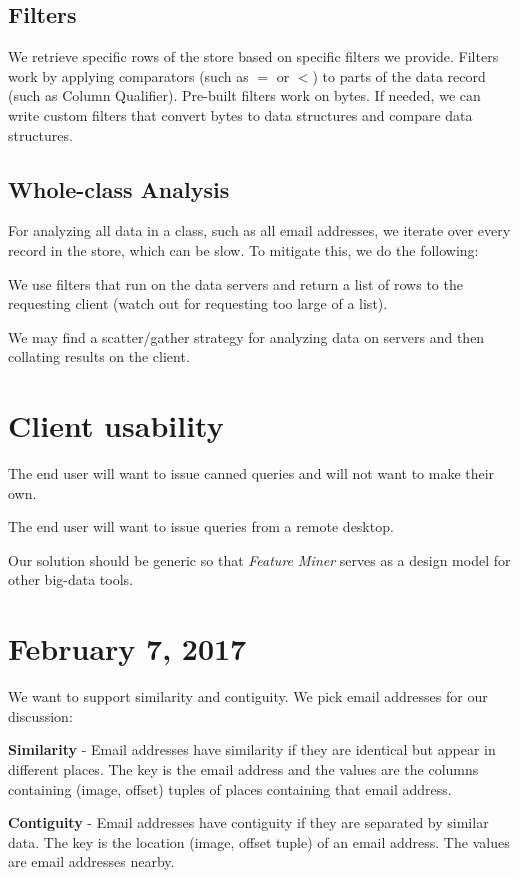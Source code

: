 \documentclass[12pt,twoside]{article}
\newcommand{\fm}{\emph{Feature Miner}\xspace}
\begin{document}
\subsection*{Filters}
We retrieve specific rows of the store based on specific filters we provide. Filters work by applying comparators (such as $=$ or $<$) to parts of the data record (such as Column Qualifier).  Pre-built filters work on bytes. If needed, we can write custom filters that convert bytes to data structures and compare data structures.

\subsection*{Whole-class Analysis}
For analyzing all data in a class, such as all email addresses, we iterate over every record in the store, which can be slow. To mitigate this, we do the following:

\begin{compactitem}
\item We use filters that run on the data servers and return a list of rows to the requesting client (watch out for requesting too large of a list).
\item We may find a scatter/gather strategy for analyzing data on servers and then collating results on the client.
\end{compactitem}

\section*{Client usability}
\begin{compactitem}
\item The end user will want to issue canned queries and will not want to make their own.
\item The end user will want to issue queries from a remote desktop.
\item Our solution should be generic so that \fm serves as a design model for other big-data tools.
\end{compactitem}

\section*{February 7, 2017}
We want to support similarity and contiguity.  We pick email addresses for our discussion:

\begin{compactitem}
\item \textbf{Similarity} - Email addresses have similarity if they are identical but appear in different places. The key is the email address and the values are the columns containing (image, offset) tuples of places containing that email address.
\item \textbf{Contiguity} - Email addresses have contiguity if they are separated by similar data.  The key is the location (image, offset tuple) of an email address.  The values are email addresses nearby.
\end{compactitem}
\end{document}
